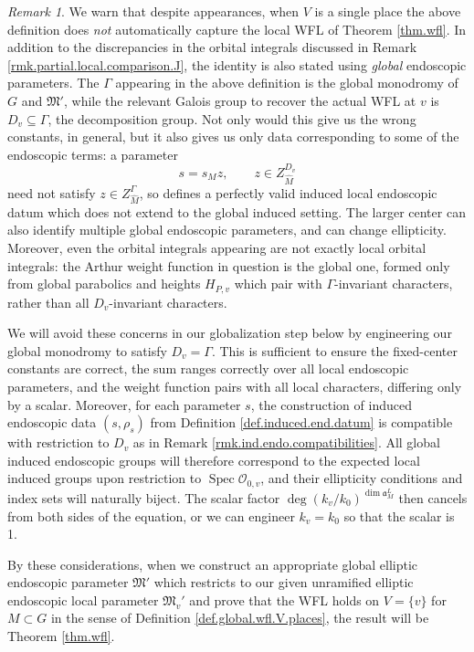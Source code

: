 \documentclass[openany]{amsbook}
\theoremstyle{definition}
\theoremstyle{remark}
\newtheorem{remark}[theorem]{Remark}
\numberwithin{equation}{section}
\renewcommand{\O}{\mathcal{O}}
\renewcommand{\-}{\operatorname{-}}
\newcommand{\Spec}{\operatorname{Spec}}
\renewcommand{\a}{\mathfrak{a}}
\newcommand{\fM}{\mathfrak{M}}
\begin{document}
\begin{remark}\label{rmk.monodr.local.global.discrep.wfl}
    We warn that despite appearances, when $V$ is a single place the above definition does \emph{not} automatically capture the local WFL of Theorem \ref{thm.wfl}. In addition to the discrepancies in the orbital integrals discussed in Remark \ref{rmk.partial.local.comparison.J},
    the identity is also stated using \emph{global} endoscopic parameters. The $\Gamma$ appearing in the above definition is the global monodromy of $G$ and $\fM'$, while the relevant Galois group to recover the actual WFL at $v$ is $D_v \subseteq \Gamma$, the decomposition group. Not only would this give us the wrong constants, in general, but it also gives us only data corresponding to some of the endoscopic terms: a parameter
    $$
        s = s_M z, \qquad z \in Z_{\widehat{M}}^{D_v}
    $$
    need not satisfy $z \in Z_{\widehat{M}}^{\Gamma}$, so defines a perfectly valid induced local endoscopic datum which does not extend to the global induced setting. The larger center can also identify multiple global endoscopic parameters, and can change ellipticity. Moreover, even the orbital integrals appearing are not exactly local orbital integrals: the Arthur weight function in question is the global one, formed only from global parabolics and heights $H_{P,v}$ which pair with $\Gamma$-invariant characters, rather than all $D_v$-invariant characters. 

    We will avoid these concerns in our globalization step below by engineering our global monodromy to satisfy $D_v = \Gamma$. This is sufficient to ensure the fixed-center constants are correct, the sum ranges correctly over all local endoscopic parameters, and the weight function pairs with all local characters, differing only by a scalar. Moreover, for each parameter $s$, the construction of induced endoscopic data $(s, \rho_s)$ from Definition \ref{def.induced.end.datum} is compatible with restriction to $D_v$ as in Remark \ref{rmk.ind.endo.compatibilities}. All global induced endoscopic groups will therefore correspond to the expected local induced groups upon restriction to $\Spec \O_{0,v}$, and their ellipticity conditions and index sets will naturally biject. The scalar factor $\deg(k_v/k_0)^{\dim \a_M^L}$ then cancels from both sides of the equation, or we can engineer $k_v = k_0$ so that the scalar is 1.
    
    By these considerations, when we construct an appropriate global elliptic endoscopic parameter $\fM'$ which restricts to our given unramified elliptic endoscopic local parameter $\fM_v'$ and prove that the WFL holds on $V = \{v\}$ for $M \subset G$ in the sense of Definition \ref{def.global.wfl.V.places}, the result will be Theorem \ref{thm.wfl}.
\end{remark}
\end{document}
